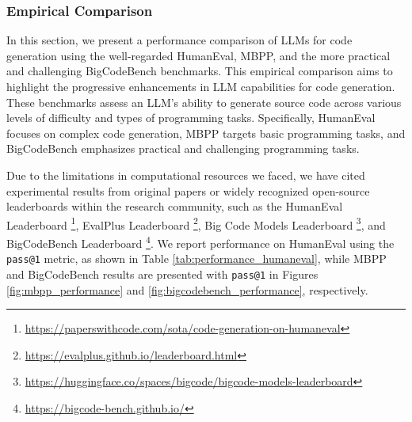 \subsubsection{Empirical Comparison}


In this section, we present a performance comparison of LLMs for code generation using the well-regarded HumanEval, MBPP, and the more practical and challenging BigCodeBench benchmarks. 
This empirical comparison aims to highlight the progressive enhancements in LLM capabilities for code generation. 
These benchmarks assess an LLM's ability to generate source code across various levels of difficulty and types of programming tasks. 
Specifically, HumanEval focuses on complex code generation, MBPP targets basic programming tasks, and BigCodeBench emphasizes practical and challenging programming tasks.

Due to the limitations in computational resources we faced, we have cited experimental results from original papers or widely recognized open-source leaderboards within the research community, such as the HumanEval Leaderboard \footnote{\href{https://paperswithcode.com/sota/code-generation-on-humaneval}{https://paperswithcode.com/sota/code-generation-on-humaneval}}, EvalPlus Leaderboard \footnote{\href{https://evalplus.github.io/leaderboard.html}{https://evalplus.github.io/leaderboard.html}}, Big Code Models Leaderboard  \footnote{\href{https://huggingface.co/spaces/bigcode/bigcode-models-leaderboard}{https://huggingface.co/spaces/bigcode/bigcode-models-leaderboard}}, and BigCodeBench Leaderboard \footnote{\href{https://bigcode-bench.github.io/}{https://bigcode-bench.github.io/}}. 
We report performance on HumanEval using the \texttt{pass@1} metric, as shown in Table \ref{tab:performance_humaneval}, while MBPP and BigCodeBench results are presented with \texttt{pass@1} in Figures \ref{fig:mbpp_performance} and \ref{fig:bigcodebench_performance}, respectively.

